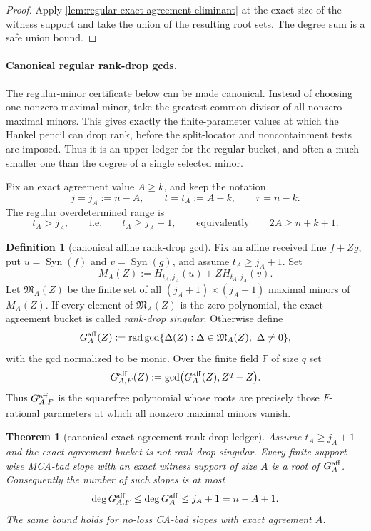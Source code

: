 \documentclass[11pt]{article}
\newtheorem{theorem}{Theorem}[section]
\theoremstyle{definition}
\newtheorem{definition}[definition]{Definition}
\theoremstyle{remark}
\newcommand{\F}{\mathbb{F}}
\newcommand{\Syn}{\operatorname{Syn}}
\begin{document}
\begin{proof}
Apply \cref{lem:regular-exact-agreement-eliminant} at the exact size of the
witness support and take the union of the resulting root sets.  The degree sum is
a safe union bound.
\end{proof}

\paragraph{Canonical regular rank-drop gcds.}
The regular-minor certificate below can be made canonical.  Instead of choosing
one nonzero maximal minor, take the greatest common divisor of all nonzero
maximal minors.  This gives exactly the finite-parameter values at which the
Hankel pencil can drop rank, before the split-locator and noncontainment tests
are imposed.  Thus it is an upper ledger for the regular bucket, and often a much
smaller one than the degree of a single selected minor.

Fix an exact agreement value $A\ge k$, and keep the notation
\[
        j=j_A:=n-A,
        \qquad
        t=t_A:=A-k,
        \qquad
        r=n-k .
\]
The regular overdetermined range is
\[
        t_A>j_A,
        \qquad\text{i.e.}\qquad
        t_A\ge j_A+1,
        \qquad\text{equivalently}\qquad
        2A\ge n+k+1 .
\]

\begin{definition}[canonical affine rank-drop gcd]
\label{def:canonical-affine-rankdrop-gcd}
Fix an affine received line $f+Zg$, put
$u=\Syn(f)$ and $v=\Syn(g)$, and assume $t_A\ge j_A+1$.  Set
\[
        M_A(Z):=H_{t_A,j_A}(u)+Z H_{t_A,j_A}(v).
\]
Let $\mathfrak M_A(Z)$ be the finite set of all $(j_A+1)\times(j_A+1)$ maximal
minors of $M_A(Z)$.  If every element of $\mathfrak M_A(Z)$ is the zero
polynomial, the exact-agreement bucket is called \emph{rank-drop singular}.
Otherwise define
\[
        G_A^{\rm aff}(Z)
        :=\operatorname{rad}\gcd\{\Delta(Z):
              \Delta\in\mathfrak M_A(Z),\ \Delta\ne0\},
\]
with the gcd normalized to be monic.  Over the finite field $\F$ of size $q$ set
\[
        G_{A,F}^{\rm aff}(Z):=
        \gcd\bigl(G_A^{\rm aff}(Z),Z^q-Z\bigr).
\]
Thus $G_{A,F}^{\rm aff}$ is the squarefree polynomial whose roots are precisely
those $F$-rational parameters at which all nonzero maximal minors vanish.
\end{definition}

\begin{theorem}[canonical exact-agreement rank-drop ledger]
\label{thm:canonical-affine-rankdrop-ledger}
Assume $t_A\ge j_A+1$ and the exact-agreement bucket is not rank-drop singular.
Every finite support-wise MCA-bad slope with an exact witness support of size
$A$ is a root of $G_A^{\rm aff}$.  Consequently the number of such slopes is at
most
\[
        \deg G_{A,F}^{\rm aff}
        \le \deg G_A^{\rm aff}
        \le j_A+1=n-A+1 .
\]
The same bound holds for no-loss CA-bad slopes with exact agreement $A$.
\end{theorem}
\end{document}

